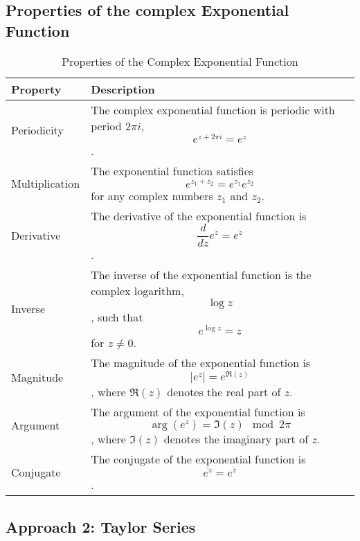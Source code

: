 \subsection*{Properties of the complex Exponential Function}
\begin{table}[htbp]
    \centering
    \begin{tabular}{| m{2.5cm} | m{11.5cm} |}
        \hline
        \textbf{Property} & \textbf{Description}                                                                                                                      \\
        \hline
        Periodicity       & The complex exponential function is periodic with period \( 2\pi i \), \[ e^{z + 2\pi i} = e^z \].                                        \\
        \hline
        Multiplication    & The exponential function satisfies \[ e^{z_1 + z_2} = e^{z_1} e^{z_2} \] for any complex numbers \( z_1 \) and \( z_2 \).                 \\
        \hline
        Derivative        & The derivative of the exponential function is \[ \frac{d}{dz} e^z = e^z \].                                                               \\
        \hline
        Inverse           & The inverse of the exponential function is the complex logarithm, \[ \log z \], such that \[ e^{\log z} = z \] for \( z \neq 0 \).        \\
        \hline
        Magnitude         & The magnitude of the exponential function is \[ |e^z| = e^{\Re(z)} \], where \( \Re(z) \) denotes the real part of \( z \).               \\
        \hline
        Argument          & The argument of the exponential function is \[ \arg(e^z) = \Im(z) \mod 2\pi \], where \( \Im(z) \) denotes the imaginary part of \( z \). \\
        \hline
        Conjugate         & The conjugate of the exponential function is \[ \overline{e^z} = e^{\overline{z}} \].                                                     \\
        \hline
    \end{tabular}
    \caption{Properties of the Complex Exponential Function}
    \label{table:complex_exponential_properties}
\end{table}

\subsection*{Approach 2: Taylor Series}

